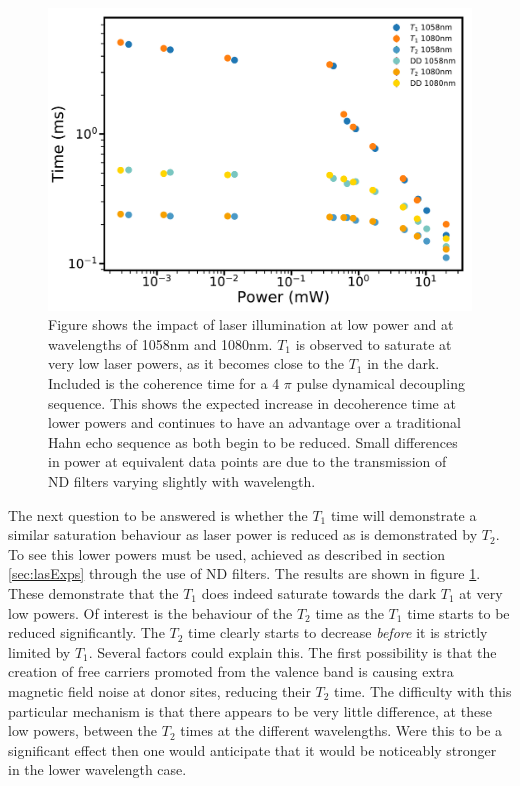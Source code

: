 \begin{figure}
\centering
\includegraphics[width=0.8\columnwidth]{Figures/T1vsT2vsDD1058and1080.pdf}
\caption[Low power $T_1$ and $T_2$ comparison]{Figure shows the impact of laser illumination at low power and at wavelengths of 1058nm and 1080nm. $T_1$ is observed to saturate at very low laser powers, as it becomes close to the $T_1$ in the dark. Included is the coherence time for a 4 $\pi$ pulse dynamical decoupling sequence. This shows the expected increase in decoherence time at lower powers and continues to have an advantage over a traditional Hahn echo sequence as both begin to be reduced. Small differences in power at equivalent data points are due to the transmission of ND filters varying slightly with wavelength.}
\label{fig:t1vst2lowpow}
\end{figure}
The next question to be answered is whether the $T_1$ time will demonstrate a similar saturation behaviour as laser power is reduced as is demonstrated by $T_2$.
To see this lower powers must be used, achieved as described in section \ref{sec:lasExps} through the use of ND filters.
The results are shown in figure \ref{fig:t1vst2lowpow}.
These demonstrate that the $T_1$ does indeed saturate towards the dark $T_1$ at very low powers.
Of interest is the behaviour of the $T_2$ time as the $T_1$ time starts to be reduced significantly.
The $T_2$ time clearly starts to decrease \textit{before} it is strictly limited by $T_1$.
Several factors could explain this.
The first possibility is that the creation of free carriers promoted from the valence band is causing extra magnetic field noise at donor sites, reducing their $T_2$ time.
The difficulty with this particular mechanism is that there appears to be very little difference, at these low powers, between the $T_2$ times at the different wavelengths. 
Were this to be a significant effect then one would anticipate that it would be noticeably stronger in the lower wavelength case.
